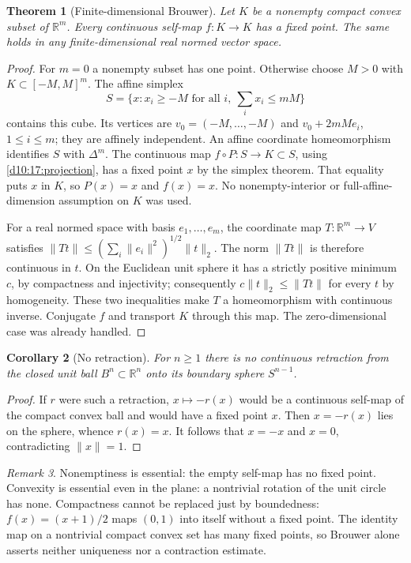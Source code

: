 \documentclass[11pt,oneside,openany]{book}
\newtheorem{theorem}{Theorem}[chapter]
\newtheorem{corollary}[theorem]{Corollary}
\theoremstyle{definition}
\theoremstyle{remark}
\newtheorem{remark}[theorem]{Remark}
\newcommand{\R}{\mathbb R}\newcommand{\C}{\mathbb C}
\newcommand{\norm}[1]{\lVert#1\rVert}
\begin{document}
\begin{theorem}[Finite-dimensional Brouwer]\label{d10:17:brouwer-convex}
Let $K$ be a nonempty compact convex subset of $\R^m$.
Every continuous self-map $f:K\to K$ has a fixed point.
The same holds in any finite-dimensional real normed vector space.
\end{theorem}
\begin{proof}
For $m=0$ a nonempty subset has one point. Otherwise choose $M>0$
with $K\subset[-M,M]^m$. The affine simplex
\[
 S=\{x:x_i\geq-M\text{ for all }i,\ \textstyle\sum_i x_i\leq mM\}
\]
contains this cube. Its vertices are $v_0=(-M,\ldots,-M)$ and
$v_0+2mM e_i$, $1\leq i\leq m$; they are affinely independent.
An affine coordinate homeomorphism identifies $S$ with $\Delta^m$.
The continuous map $f\circ P:S\to K\subset S$, using
\cref{d10:17:projection}, has a fixed point $x$ by the simplex
theorem. That equality puts $x$ in $K$, so $P(x)=x$ and $f(x)=x$.
No nonempty-interior or full-affine-dimension assumption on $K$ was used.

For a real normed space with basis $e_1,\ldots,e_m$, the coordinate
map $T:\R^m\to V$ satisfies
$\norm{Tt}\leq(\sum_i\norm{e_i}^2)^{1/2}\norm{t}_2$.
The norm $\norm{Tt}$ is therefore continuous in $t$.
On the Euclidean unit sphere it has a strictly positive minimum $c$,
by compactness and injectivity; consequently
$c\norm{t}_2\leq\norm{Tt}$ for every $t$ by homogeneity.
These two inequalities make $T$ a homeomorphism with continuous inverse.
Conjugate $f$ and transport $K$ through this map. The zero-dimensional
case was already handled.
\end{proof}

\begin{corollary}[No retraction]\label{d10:17:no-retraction}
For $n\geq1$ there is no continuous retraction from the closed unit ball
$B^n\subset\R^n$ onto its boundary sphere $S^{n-1}$.
\end{corollary}
\begin{proof}
If $r$ were such a retraction, $x\mapsto-r(x)$ would be a continuous
self-map of the compact convex ball and would have a fixed point $x$.
Then $x=-r(x)$ lies on the sphere, whence $r(x)=x$.
It follows that $x=-x$ and $x=0$, contradicting $\norm{x}=1$.
\end{proof}

\begin{remark}\label{d10:17:fixed-point-boundaries}
Nonemptiness is essential: the empty self-map has no fixed point.
Convexity is essential even in the plane: a nontrivial rotation of the
unit circle has none. Compactness cannot be replaced just by boundedness:
$f(x)=(x+1)/2$ maps $(0,1)$ into itself without a fixed point.
The identity map on a nontrivial compact convex set has many fixed points,
so Brouwer alone asserts neither uniqueness nor a contraction estimate.
\end{remark}
\end{document}
